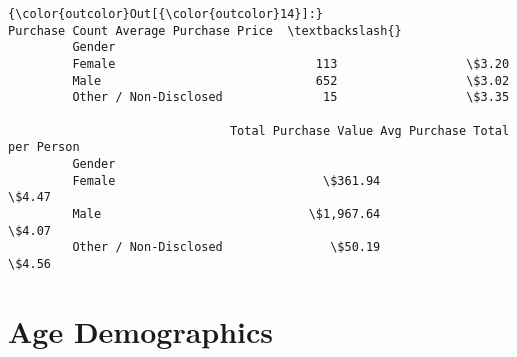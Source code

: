 \documentclass[11pt]{article}
\begin{document}
\begin{Verbatim}[commandchars=\\\{\}]
{\color{outcolor}Out[{\color{outcolor}14}]:}                        Purchase Count Average Purchase Price  \textbackslash{}
         Gender                                                         
         Female                            113                  \$3.20   
         Male                              652                  \$3.02   
         Other / Non-Disclosed              15                  \$3.35   
         
                               Total Purchase Value Avg Purchase Total per Person  
         Gender                                                                    
         Female                             \$361.94                         \$4.47  
         Male                             \$1,967.64                         \$4.07  
         Other / Non-Disclosed               \$50.19                         \$4.56  
\end{Verbatim}
            
    \section{Age Demographics}\label{age-demographics}
\end{document}
